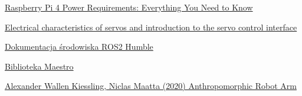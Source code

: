 \documentclass[a4paper,13pt]{article}
\begin{document}
\begin{thebibliography}{9}
\href{https://raspberryexpert.com/raspberry-pi-4-power-requirements/}{Raspberry Pi 4 Power Requirements: Everything You Need to Know}

\href{https://www.pololu.com/blog/16/electrical-characteristics-of-servos-and-introduction-to-the-servo-control-interface}{Electrical characteristics of servos and introduction to the servo control interface}

\href{https://docs.ros.org/en/humble/index.html}{Dokumentacja środowiska ROS2 Humble}

\href{https://github.com/FRC4564/Maestro/blob/master/maestro.py}{Biblioteka Maestro}


\bibitem{}
\href{https://www.diva-portal.org/smash/get/diva2:1462059/FULLTEXT01.pdf}{Alexander Wallen Kiessling, Niclas Maatta (2020) Anthropomorphic Robot Arm}

\end{thebibliography}
\end{document}
